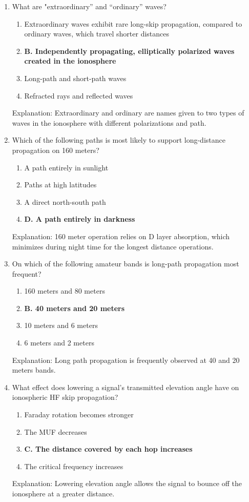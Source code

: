 \begin{enumerate}
       \item What are "extraordinary” and “ordinary” waves?
        \begin{enumerate}
          \item  Extraordinary waves exhibit rare long-skip propagation, compared to ordinary waves, which travel shorter distances
        \item \textbf{B. Independently propagating, elliptically polarized waves created in the ionosphere}
        \item  Long-path and short-path waves
        \item  Refracted rays and reflected waves
      \end{enumerate}
     \textcolor{myred}{Explanation:}
       Extraordinary and ordinary are names given to two types of waves in the ionosphere with different polarizations and path.

     \item Which of the following paths is most likely to support long-distance propagation on 160 meters?
        \begin{enumerate}
         \item  A path entirely in sunlight
          \item  Paths at high latitudes
       \item  A direct north-south path
       \item \textbf{D. A path entirely in darkness}
    \end{enumerate}
     \textcolor{myred}{Explanation:}
       160 meter operation relies on D layer absorption, which minimizes during night time for the longest distance operations.
       
       \item On which of the following amateur bands is long-path propagation most frequent?
      \begin{enumerate}
          \item  160 meters and 80 meters
      \item \textbf{B. 40 meters and 20 meters}
      \item  10 meters and 6 meters
        \item  6 meters and 2 meters
        \end{enumerate}
         \textcolor{myred}{Explanation:}
       Long path propagation is frequently observed at 40 and 20 meters bands.

     \item What effect does lowering a signal's transmitted elevation angle have on ionospheric HF skip propagation?
       \begin{enumerate}
         \item  Faraday rotation becomes stronger
         \item  The MUF decreases
       \item \textbf{C. The distance covered by each hop increases}
     \item  The critical frequency increases
        \end{enumerate}
       \textcolor{myred}{Explanation:}
    Lowering elevation angle allows the signal to bounce off the ionosphere at a greater distance.
        

\end{enumerate}
